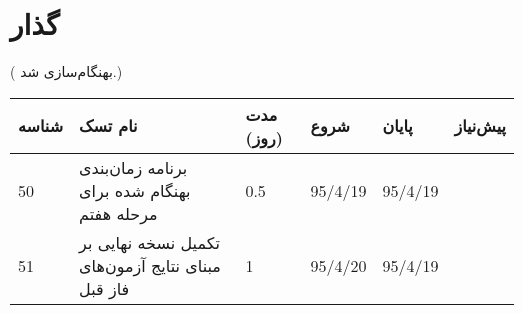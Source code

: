 \section{گذار}
({\color{red} بهنگام‌سازی شد.})

\begin{tabular}[H]{ | l | l | l | l | l | l | }
	\hline
	شناسه & نام تسک & مدت (روز) & شروع & پایان & پیش‌نیاز    \\ \hline
	50 & برنامه زمان‌بندی بهنگام شده برای مرحله هفتم & 0.5   &   95/4/19 &   95/4/19 &     \\ \hline
	51 & تکمیل نسخه نهایی بر مبنای نتایج آزمون‌های فاز قبل & 1   &   95/4/20 &   95/4/19 &     \\ \hline
	
\end{tabular}
\restoregeometry